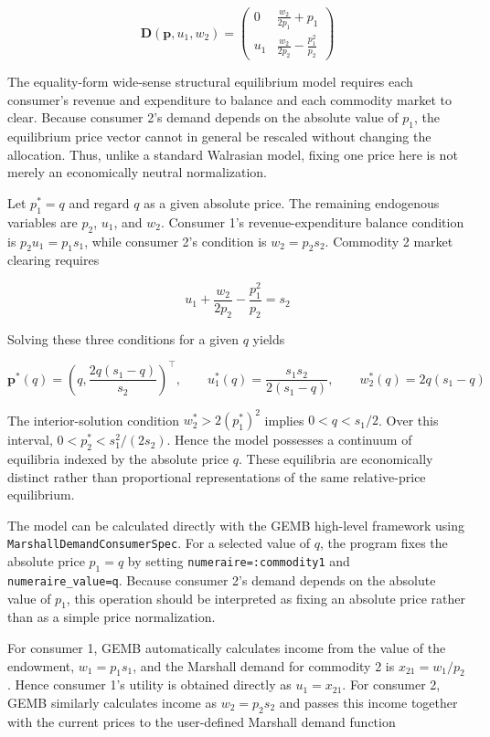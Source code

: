 \documentclass[
  letterpaper,
  DIV=11,
  numbers=noendperiod]{scrreprt}
\begin{document}
\[
\mathbf D(\mathbf p,u_1,w_2)=
\begin{pmatrix}
0&\frac{w_2}{2p_1}+p_1\\
u_1&\frac{w_2}{2p_2}-\frac{p_1^2}{p_2}
\end{pmatrix}
\]

The equality-form wide-sense structural equilibrium model requires each
consumer's revenue and expenditure to balance and each commodity market
to clear. Because consumer 2's demand depends on the absolute value of
\(p_1\), the equilibrium price vector cannot in general be rescaled
without changing the allocation. Thus, unlike a standard Walrasian
model, fixing one price here is not merely an economically neutral
normalization.

Let \(p_1^*=q\) and regard \(q\) as a given absolute price. The
remaining endogenous variables are \(p_2\), \(u_1\), and \(w_2\).
Consumer 1's revenue-expenditure balance condition is \(p_2u_1=p_1s_1\),
while consumer 2's condition is \(w_2=p_2s_2\). Commodity 2 market
clearing requires

\[
u_1+\frac{w_2}{2p_2}-\frac{p_1^2}{p_2}=s_2
\]

Solving these three conditions for a given \(q\) yields

\[
\mathbf p^*(q)
=
\left(
q,\frac{2q(s_1-q)}{s_2}
\right)^\top,
\qquad
u_1^*(q)=\frac{s_1s_2}{2(s_1-q)},
\qquad
w_2^*(q)=2q(s_1-q)
\]

The interior-solution condition \(w_2^*>2(p_1^*)^2\) implies
\(0<q<s_1/2\). Over this interval, \(0<p_2^*<s_1^2/(2s_2)\). Hence the
model possesses a continuum of equilibria indexed by the absolute price
\(q\). These equilibria are economically distinct rather than
proportional representations of the same relative-price equilibrium.

The model can be calculated directly with the GEMB high-level framework
using \texttt{MarshallDemandConsumerSpec}. For a selected value of
\(q\), the program fixes the absolute price \(p_1=q\) by setting
\texttt{numeraire=:commodity1} and \texttt{numeraire\_value=q}. Because
consumer 2's demand depends on the absolute value of \(p_1\), this
operation should be interpreted as fixing an absolute price rather than
as a simple price normalization.

For consumer 1, GEMB automatically calculates income from the value of
the endowment, \(w_1=p_1s_1\), and the Marshall demand for commodity 2
is \(x_{21}=w_1/p_2\). Hence consumer 1's utility is obtained directly
as \(u_1=x_{21}\). For consumer 2, GEMB similarly calculates income as
\(w_2=p_2s_2\) and passes this income together with the current prices
to the user-defined Marshall demand function
\end{document}
